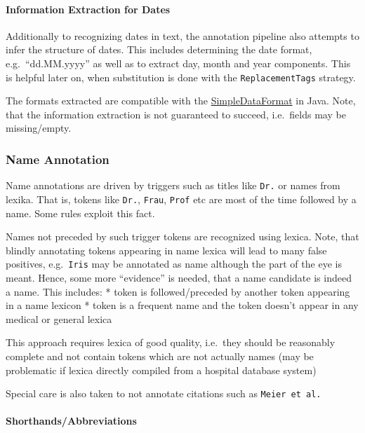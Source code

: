 \paragraph{Information Extraction for
Dates}\label{information-extraction-for-dates}

Additionally to recognizing dates in text, the annotation pipeline also
attempts to infer the structure of dates. This includes determining the
date format, e.g.~``dd.MM.yyyy'' as well as to extract day, month and
year components. This is helpful later on, when substitution is done
with the \texttt{ReplacementTags} strategy.

The formats extracted are compatible with the
\href{https://docs.oracle.com/javase/8/docs/api/java/text/SimpleDateFormat.html}{SimpleDataFormat}
in Java. Note, that the information extraction is not guaranteed to
succeed, i.e.~fields may be missing/empty.

\subsubsection{Name Annotation}\label{name-annotation}

Name annotations are driven by triggers such as titles like \texttt{Dr.}
or names from lexika. That is, tokens like \texttt{Dr.}, \texttt{Frau},
\texttt{Prof} etc are most of the time followed by a name. Some rules
exploit this fact.

Names not preceded by such trigger tokens are recognized using lexica.
Note, that blindly annotating tokens appearing in name lexica will lead
to many false positives, e.g.~\texttt{Iris} may be annotated as name
although the part of the eye is meant. Hence, some more ``evidence'' is
needed, that a name candidate is indeed a name. This includes: * token
is followed/preceded by another token appearing in a name lexicon *
token is a frequent name and the token doesn't appear in any medical or
general lexica

This approach requires lexica of good quality, i.e.~they should be
reasonably complete and not contain tokens which are not actually names
(may be problematic if lexica directly compiled from a hospital database
system)

Special care is also taken to not annotate citations such as
\texttt{Meier\ et\ al.}

\paragraph{Shorthands/Abbreviations}\label{shorthandsabbreviations}

